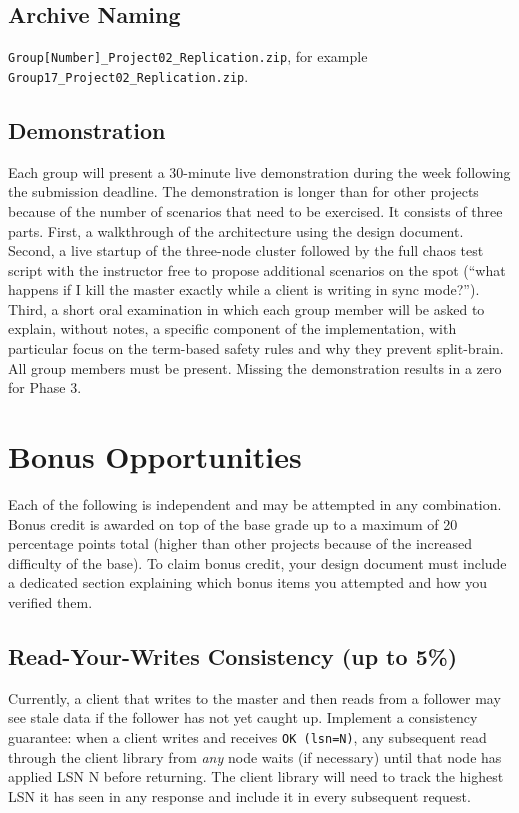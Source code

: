\documentclass[11pt,a4paper]{article}
\begin{document}
\subsection{Archive Naming}
\texttt{Group[Number]\_Project02\_Replication.zip}, for example \texttt{Group17\_Project02\_Replication.zip}.

\subsection{Demonstration}
Each group will present a 30-minute live demonstration during the week following the submission deadline. The demonstration is longer than for other projects because of the number of scenarios that need to be exercised. It consists of three parts. First, a walkthrough of the architecture using the design document. Second, a live startup of the three-node cluster followed by the full chaos test script with the instructor free to propose additional scenarios on the spot (``what happens if I kill the master exactly while a client is writing in sync mode?''). Third, a short oral examination in which each group member will be asked to explain, without notes, a specific component of the implementation, with particular focus on the term-based safety rules and why they prevent split-brain. All group members must be present. Missing the demonstration results in a zero for Phase 3.

\section{Bonus Opportunities}

Each of the following is independent and may be attempted in any combination. Bonus credit is awarded on top of the base grade up to a maximum of 20 percentage points total (higher than other projects because of the increased difficulty of the base). To claim bonus credit, your design document must include a dedicated section explaining which bonus items you attempted and how you verified them.

\subsection{Read-Your-Writes Consistency (up to 5\%)}
Currently, a client that writes to the master and then reads from a follower may see stale data if the follower has not yet caught up. Implement a consistency guarantee: when a client writes and receives \texttt{OK (lsn=N)}, any subsequent read through the client library from \textit{any} node waits (if necessary) until that node has applied LSN N before returning. The client library will need to track the highest LSN it has seen in any response and include it in every subsequent request.
\end{document}
